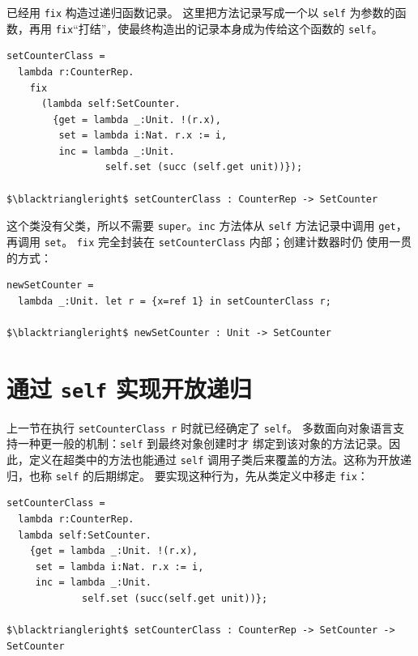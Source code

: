 已经用 \texttt{fix} 构造过递归函数记录。
这里把方法记录写成一个以 \texttt{self} 为参数的函数，再用
\texttt{fix}“打结”，使最终构造出的记录本身成为传给这个函数的
\texttt{self}。

\begin{lstlisting}[mathescape=true]
setCounterClass =
  lambda r:CounterRep.
    fix
      (lambda self:SetCounter.
        {get = lambda _:Unit. !(r.x),
         set = lambda i:Nat. r.x := i,
         inc = lambda _:Unit.
                 self.set (succ (self.get unit))});

$\blacktriangleright$ setCounterClass : CounterRep -> SetCounter
\end{lstlisting}

这个类没有父类，所以不需要 \texttt{super}。\texttt{inc} 方法体从
\texttt{self} 方法记录中调用 \texttt{get}，再调用 \texttt{set}。
\texttt{fix} 完全封装在 \texttt{setCounterClass} 内部；创建计数器时仍
使用一贯的方式：

\begin{lstlisting}[mathescape=true]
newSetCounter =
  lambda _:Unit. let r = {x=ref 1} in setCounterClass r;

$\blacktriangleright$ newSetCounter : Unit -> SetCounter
\end{lstlisting}


\section{通过 \texttt{self} 实现开放递归}
\label{sec:18.10}

上一节在执行 \texttt{setCounterClass r} 时就已经确定了 \texttt{self}。
多数面向对象语言支持一种更一般的机制：\texttt{self} 到最终对象创建时才
绑定到该对象的方法记录。因此，定义在超类中的方法也能通过 \texttt{self}
调用子类后来覆盖的方法。这称为开放递归，也称 \texttt{self} 的后期绑定。
要实现这种行为，先从类定义中移走 \texttt{fix}：

\begin{lstlisting}[mathescape=true]
setCounterClass =
  lambda r:CounterRep.
  lambda self:SetCounter.
    {get = lambda _:Unit. !(r.x),
     set = lambda i:Nat. r.x := i,
     inc = lambda _:Unit.
             self.set (succ(self.get unit))};

$\blacktriangleright$ setCounterClass : CounterRep -> SetCounter -> SetCounter
\end{lstlisting}

